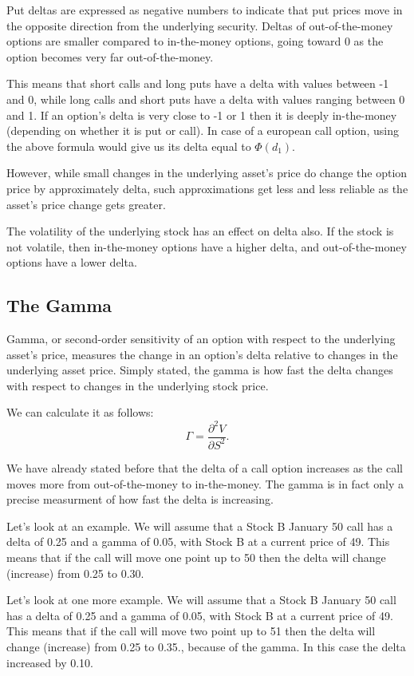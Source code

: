 \documentclass[a4paper, 12pt]{article}
\theoremstyle{definition}
\theoremstyle{plain}
\theoremstyle{definition}
\begin{document}
Put deltas are expressed as negative numbers to indicate that put prices move
in the opposite direction from the underlying security. 
Deltas of out-of-the-money options are smaller 
compared to in-the-money options, going toward 0 as the option becomes
very far out-of-the-money. 

This means that short calls and long puts have 
a delta with values between -1 and 0, while 
long calls and short puts have a delta
with values ranging between 0 and 1.
If an option's delta is very close to -1 or 1 
then it is deeply in-the-money
(depending on whether it is put or call).
In case of a european call option, 
using the above formula would give us 
its delta equal to $\Phi(d_1)$. 

However, while small changes in the underlying asset's
price do change the option price by approximately delta,
such approximations get less and less reliable as 
the asset's price change gets greater.

The volatility of the underlying stock has an effect on delta also. If the stock is not
volatile, then in-the-money options have a higher delta, and out-of-the-money
options have a lower delta.


\subsection{The Gamma}

Gamma, or second-order sensitivity of an option 
with respect to the underlying asset's price, 
measures the change in an option's delta relative to changes 
in the underlying asset price. 
Simply stated, the gamma is how fast the delta changes with respect to changes in the
underlying stock price.

We can calculate it as follows:
$$
\Gamma = \frac{\partial^2 V}{\partial S^2}.
$$

We have already stated before that the delta of a call option 
increases as the call moves more from out-of-the-money to in-the-money.
The gamma is in fact only a precise measurment of how fast the delta is 
increasing.

Let's look at an example. We will assume that a Stock B January 50 call has a delta of 0.25
and a gamma of 0.05, with Stock B at a current price of 49. 
This means that if the call will move one point up to 50
then the delta will change (increase) from 0.25 to 0.30.

Let's look at one more example. We will assume that a Stock B January 50 call has a 
delta of 0.25 and a gamma of 0.05, with Stock B at a current price of 49. 
This means that if the call will move two point up to 51
then the delta will change (increase) from 0.25 to 0.35.,
because of the gamma.
In this case the delta increased by 0.10.
\end{document}

